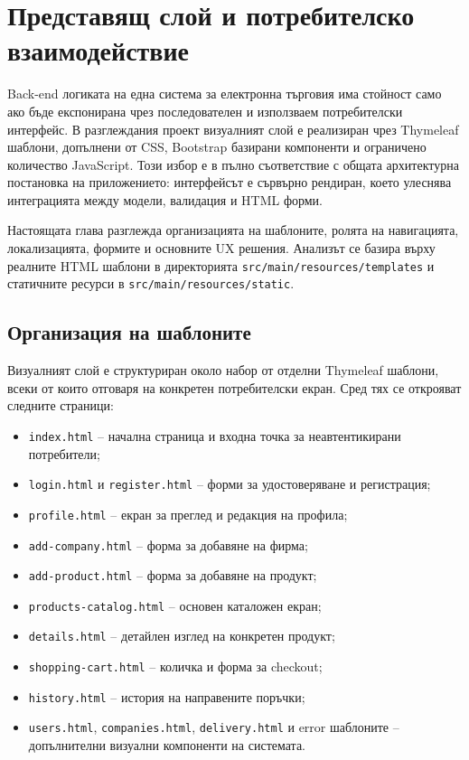 \section{Представящ слой и потребителско взаимодействие}

Back-end логиката на една система за електронна търговия има стойност само ако бъде експонирана чрез последователен и използваем потребителски интерфейс. В разглеждания проект визуалният слой е реализиран чрез Thymeleaf шаблони, допълнени от CSS, Bootstrap базирани компоненти и ограничено количество JavaScript. Този избор е в пълно съответствие с общата архитектурна постановка на приложението: интерфейсът е сървърно рендиран, което улеснява интеграцията между модели, валидация и HTML форми.

Настоящата глава разглежда организацията на шаблоните, ролята на навигацията, локализацията, формите и основните UX решения. Анализът се базира върху реалните HTML шаблони в директорията \texttt{src/main/resources/templates} и статичните ресурси в \texttt{src/main/resources/static}.

\subsection{Организация на шаблоните}

Визуалният слой е структуриран около набор от отделни Thymeleaf шаблони, всеки от които отговаря на конкретен потребителски екран. Сред тях се открояват следните страници:

\begin{itemize}[leftmargin=*]
    \item \texttt{index.html} -- начална страница и входна точка за неавтентикирани потребители;
    \item \texttt{login.html} и \texttt{register.html} -- форми за удостоверяване и регистрация;
    \item \texttt{profile.html} -- екран за преглед и редакция на профила;
    \item \texttt{add-company.html} -- форма за добавяне на фирма;
    \item \texttt{add-product.html} -- форма за добавяне на продукт;
    \item \texttt{products-catalog.html} -- основен каталожен екран;
    \item \texttt{details.html} -- детайлен изглед на конкретен продукт;
    \item \texttt{shopping-cart.html} -- количка и форма за checkout;
    \item \texttt{history.html} -- история на направените поръчки;
    \item \texttt{users.html}, \texttt{companies.html}, \texttt{delivery.html} и error шаблоните -- допълнителни визуални компоненти на системата.
\end{itemize}

